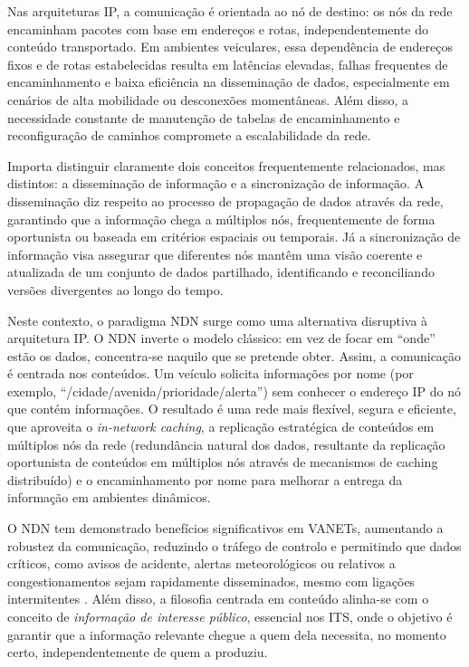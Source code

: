 Nas arquiteturas IP, a comunicação é orientada ao nó de destino: os nós da rede encaminham pacotes com base em endereços e rotas, independentemente do conteúdo transportado. Em ambientes veiculares, essa dependência de endereços fixos e de rotas estabelecidas resulta em latências elevadas, falhas frequentes de encaminhamento e baixa eficiência na disseminação de dados, especialmente em cenários de alta mobilidade ou desconexões momentâneas. Além disso, a necessidade constante de manutenção de tabelas de encaminhamento e reconfiguração de caminhos compromete a escalabilidade da rede.

Importa distinguir claramente dois conceitos frequentemente relacionados, mas distintos: a disseminação de informação e a sincronização de informação. A disseminação diz respeito ao processo de propagação de dados através da rede, garantindo que a informação chega a múltiplos nós, frequentemente de forma oportunista ou baseada em critérios espaciais ou temporais. Já a sincronização de informação visa assegurar que diferentes nós mantêm uma visão coerente e atualizada de um conjunto de dados partilhado, identificando e reconciliando versões divergentes ao longo do tempo.

Neste contexto, o paradigma \gls{NDN} surge como uma alternativa disruptiva à arquitetura IP. O \gls{NDN} inverte o modelo clássico: em vez de focar em “onde” estão os dados, concentra-se naquilo que se pretende obter. Assim, a comunicação é centrada nos conteúdos. Um veículo solicita informações por nome (por exemplo, “/cidade/avenida/prioridade/alerta”) sem conhecer o endereço IP do nó que contém informações. O resultado é uma rede mais flexível, segura e eficiente, que aproveita o \textit{in-network caching}, a replicação estratégica de conteúdos em múltiplos nós da rede (redundância natural dos dados, resultante da replicação oportunista de conteúdos em múltiplos nós através de mecanismos de caching distribuído) e o encaminhamento por nome para melhorar a entrega da informação em ambientes dinâmicos.

O \gls{NDN} tem demonstrado benefícios significativos em \gls{VANETs}, aumentando a robustez da comunicação, reduzindo o tráfego de controlo e permitindo que dados críticos, como avisos de acidente, alertas meteorológicos ou relativos a congestionamentos sejam rapidamente disseminados, mesmo com ligações intermitentes \cite{da_silva_realization_2022}. Além disso, a filosofia centrada em conteúdo alinha-se com o conceito de \textit{informação de interesse público}, essencial nos \gls{ITS}, onde o objetivo é garantir que a informação relevante chegue a quem dela necessita, no momento certo, independentemente de quem a produziu.  


